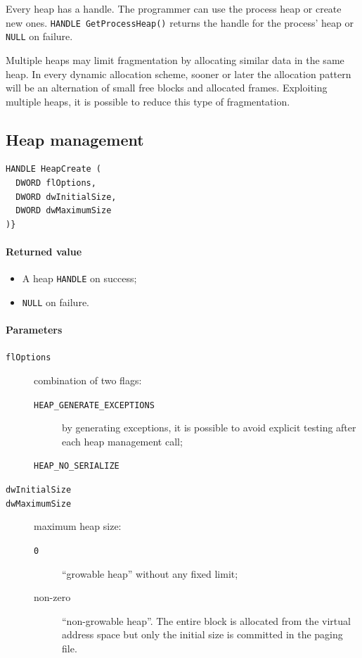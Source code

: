 Every heap has a handle. The programmer can use the process heap or create new ones. \texttt{HANDLE GetProcessHeap()} returns the handle for the process' heap or \texttt{NULL} on failure.

Multiple heaps may limit fragmentation by allocating similar data in the same heap. In every dynamic allocation scheme, sooner or later the allocation pattern will be an alternation of small free blocks and allocated frames. Exploiting multiple heaps, it is possible to reduce this type of fragmentation.

\subsection{Heap management}
\begin{verbatim}
HANDLE HeapCreate (
  DWORD flOptions,
  DWORD dwInitialSize,
  DWORD dwMaximumSize
)}
\end{verbatim}

\paragraph{Returned value}
\begin{itemize}
\item A heap \texttt{HANDLE} on success;
\item \texttt{NULL} on failure.
\end{itemize}

\paragraph{Parameters}
\begin{description}
\item [\texttt{flOptions}] combination of two flags:
\begin{description}
\item [\texttt{HEAP\_GENERATE\_EXCEPTIONS}] by generating exceptions, it is possible to avoid explicit testing after each heap management call;
\item [\texttt{HEAP\_NO\_SERIALIZE}]
\end{description}
\item [\texttt{dwInitialSize}]
\item [\texttt{dwMaximumSize}] maximum heap size:
\begin{description}
\item [\texttt{0}] ``growable heap'' without any fixed limit;
\item [non-zero] ``non-growable heap''. The entire block is allocated from the virtual address space but only the initial size is committed in the paging file.
\end{description}
\end{description}

